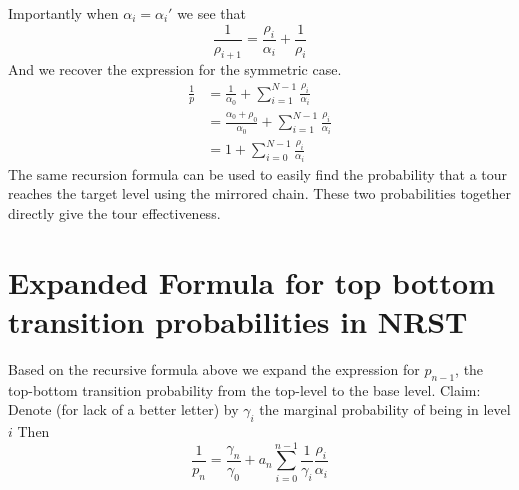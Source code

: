 \documentclass{article}
\begin{document}
Importantly when $\alpha_i=\alpha_i'$ we see that
\[ \frac{1}{\rho_{i+1}} = \frac{\rho_i}{\alpha_i}+\frac{1}{\rho_i} \]
And we recover the expression for the symmetric case. 
\begin{align*}
    \frac{1}{p} &= \frac{1}{\alpha_0} + \sum_{i=1}^{N-1} \frac{\rho_i}{\alpha_i} \\
    &= \frac{\alpha_0+\rho_0}{\alpha_0} +  \sum_{i=1}^{N-1} \frac{\rho_i}{\alpha_i} \\
    &= 1+ \sum_{i=0}^{N-1} \frac{\rho_i}{\alpha_i}
\end{align*} 
The same recursion formula can be used to easily find the probability that a
tour reaches the target level using the mirrored chain. These two probabilities
together directly give the tour effectiveness.

\section{Expanded Formula for top bottom transition probabilities in NRST}
Based on the recursive formula above we expand the expression for $p_{n-1}$, the
top-bottom transition probability from the top-level to the base level. Claim:
Denote (for lack of a better letter) by $\gamma_i$ the marginal probability of being
in level $i$ Then
\[ \frac{1}{p_{n}} = \frac{\gamma_n}{\gamma_0} + a_{n}\sum_{i=0}^{n-1}
\frac{1}{\gamma_i}\frac{\rho_i}{\alpha_i} \]
\end{document}
